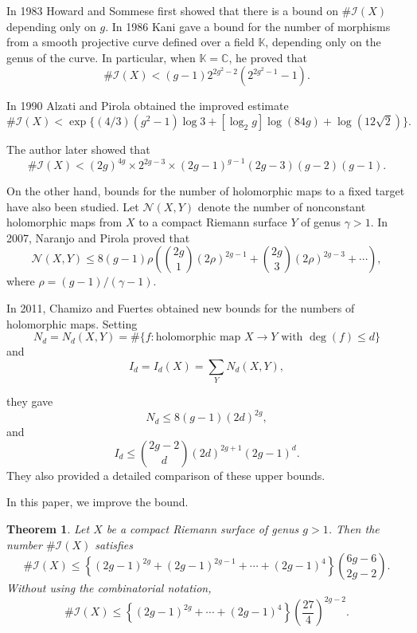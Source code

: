 \documentclass[11pt]{article}
\numberwithin{equation}{section}
\theoremstyle{plain}
\newtheorem{theorem}{Theorem}[section] %
\begin{document}
In 1983 Howard and Sommese \cite{H-S} first showed that there is a bound on
$\#\mathcal I(X)$ depending only on $g$.
In 1986 Kani \cite{K} gave a bound for the number of morphisms from a smooth
projective curve defined over a field $\mathbb K$, depending only on the genus
of the curve. In particular, when $\mathbb K=\mathbb C$, he proved that
\begin{equation*}
\#\mathcal I(X)
<
(g-1)2^{2g^{2}-2}(2^{2g^{2}-1}-1).
\end{equation*}

In 1990 Alzati and Pirola \cite{A-P} obtained the improved estimate
\begin{equation*}
\#\mathcal I(X)
<
\exp\{(4/3)(g^{2}-1)\log 3
+[\log_{2}g]\log(84g)
+\log(12\sqrt2)\}.
\end{equation*}

The author \cite{T2} later showed that
\begin{equation*}
\#\mathcal I(X)
<
(2g)^{4g}\times2^{2g-3}
\times(2g-1)^{g-1}(2g-3)(g-2)(g-1).
\end{equation*}

On the other hand, bounds for the number of holomorphic maps to a fixed
target have also been studied.
Let $\mathcal N(X,Y)$ denote the number of nonconstant holomorphic maps
from $X$ to a compact Riemann surface $Y$ of genus $\gamma >1$.
In 2007, Naranjo and Pirola \cite{N-P} proved that
\begin{equation*}\label{NP}
\mathcal N(X,Y)
\le
8(g-1)\rho
\left(
\binom{2g}{1}(2\rho)^{2g-1}
+
\binom{2g}{3}(2\rho)^{2g-3}
+\cdots
\right),
\end{equation*}
where
$
\rho=(g-1)/(\gamma -1).
$

In 2011, Chamizo and Fuertes \cite{Ch} obtained new bounds for the numbers
of holomorphic maps. 
Setting
\[
N_d=N_d(X,Y)
=\#\{f:\text{holomorphic map }X\to Y
\text{ with }\deg(f)\le d\}
\]
and
\[
I_d=I_d(X)
=\sum_{Y}N_d(X,Y),
\]

they gave
\[
N_d\le 8(g-1)(2d)^{2g},
\]
and
\begin{equation}\label{ineq}
I_d\le
\binom{2g-2}{d}
(2d)^{2g+1}(2g-1)^d.
\end{equation}
They also provided a detailed comparison of these upper bounds.

In this paper, we  improve the bound. 


\begin{theorem}\label{thm}
Let $X$ be a compact Riemann surface of genus $g>1$. Then the number $\#\mathcal{I}(X)$ satisfies
\begin{equation}\label{eq1}
\#\mathcal{I}(X)\le
\left\{ \left(2g-1\right)^{2g}
+\left(2g-1\right)^{2g-1}+\cdots +\left(2g-1\right)^{4}\right\}  \binom{6g-6}{2g-2}.
\end{equation}
Without using the combinatorial notation,
\begin{equation}\label{eq2}
\#\mathcal I(X)
\le
\left\{
(2g-1)^{2g}
+\cdots+
(2g-1)^4
\right\}
\left(\frac{27}{4}\right)^{2g-2}.
\end{equation}
\end{theorem}
\end{document}
